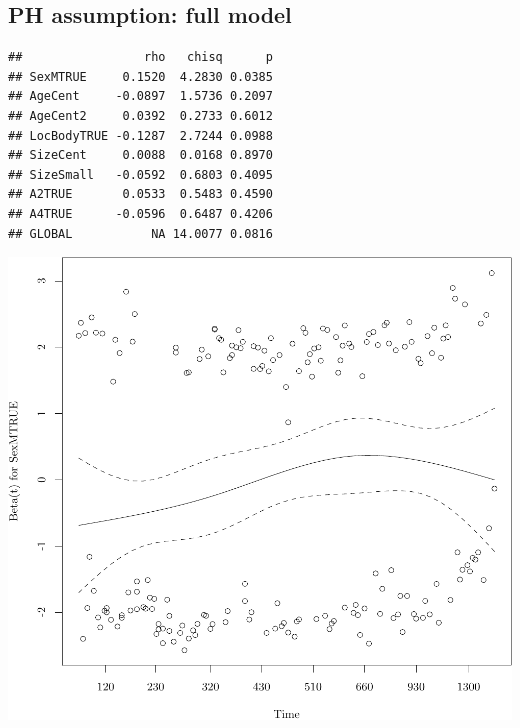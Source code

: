 \documentclass{article}
\begin{document}
\subsection{PH assumption: full model}
\begin{knitrout}
\color{fgcolor}\begin{kframe}
\begin{alltt}
 \hlkwb{=} \hlstd{(} \hlopt{~}  \hlopt{+}  \hlopt{+}  \hlopt{+}  \hlopt{+}  \hlopt{+}  \hlopt{+}  \hlopt{+}   
\end{alltt}
\begin{verbatim}
##                 rho   chisq      p
## SexMTRUE     0.1520  4.2830 0.0385
## AgeCent     -0.0897  1.5736 0.2097
## AgeCent2     0.0392  0.2733 0.6012
## LocBodyTRUE -0.1287  2.7244 0.0988
## SizeCent     0.0088  0.0168 0.8970
## SizeSmall   -0.0592  0.6803 0.4095
## A2TRUE       0.0533  0.5483 0.4590
## A4TRUE      -0.0596  0.6487 0.4206
## GLOBAL           NA 14.0077 0.0816
\end{verbatim}
\begin{alltt}
\hlstd{(}
\end{alltt}
\end{kframe}

{\centering \includegraphics[width=\maxwidth]{figure/05-eda-ph-check-full-1} 

}
\end{knitrout}
\end{document}

